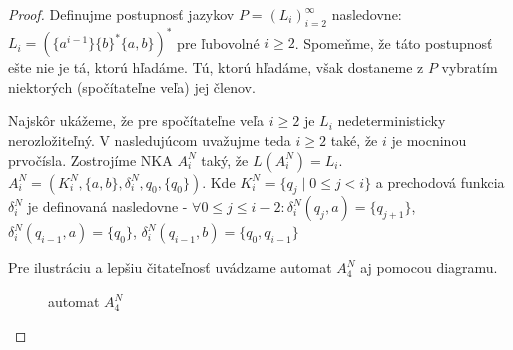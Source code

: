 \begin{proof}
Definujme postupnosť jazykov $ P=(L_i)_{i=2}^{\infty} $ nasledovne: $ L_i = (\lbrace a^{i-1} \rbrace \lbrace b \rbrace^* \lbrace a,b \rbrace)^* $ pre ľubovolné $ i \geq 2 $. Spomeňme, že táto postupnosť ešte nie je tá, ktorú hľadáme. Tú, ktorú hľadáme, však dostaneme z $ P $ vybratím niektorých (spočítateľne veľa) jej členov.
\par
Najskôr ukážeme, že pre spočítateľne veľa $ i \geq 2 $ je $ L_i $ nedeterministicky nerozložiteľný. V nasledujúcom uvažujme teda $ i \geq 2 $ také, že $ i $ je mocninou prvočísla. Zostrojíme NKA $ A_i^N $ taký, že $ L(A_i^N) = L_i $. $ A_i^N = (K_i^N, \lbrace a,b \rbrace, \delta_i^N,q_0,\lbrace q_0 \rbrace) $. Kde $ K_i^N = \lbrace q_j \; | \; 0 \leq j < i \rbrace $ a prechodová funkcia $ \delta_i^N $ je definovaná nasledovne - $ \forall 0 \leq j \leq i-2: \delta_i^N(q_j,a) = \lbrace q_{j+1} \rbrace $, $ \delta_i^N(q_{i-1},a)=\lbrace q_0 \rbrace  $, $ \delta_i^N(q_{i-1},b)=\lbrace q_0,q_{i-1} \rbrace  $

Pre ilustráciu a lepšiu čitateľnosť uvádzame automat $ A_4^N $ aj pomocou diagramu.

\begin{figure}[H]
\centering
{}
\caption{automat $ A_4^N $}
\end{figure}


\end{proof}
